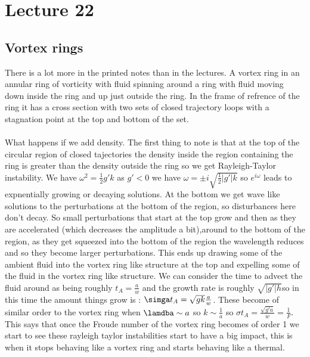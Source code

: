 \documentclass{article}
\begin{document}
                         \section{Lecture 22}
                         \subsection{Vortex rings}
                         There is a lot more in the printed notes than in the lectures. A vortex ring in an annular ring of vorticity with fluid spinning around a ring with fluid moving down inside the ring and up just outside the ring. In the frame of refrence of the ring it has a cross section with two sets of closed trajectory loops with a stagnation point at the top and bottom of the set.\\\\
                         What happens if we add density. The first thing to note is that at the top of the circular region of closed tajectories the density inside the region containing the ring is greater than the density outside the ring so we get Rayleigh-Taylor instability. We have $\omega^2 = \frac{1}{2} g' k$ as $g' <0$ we have $\omega = \pm i \sqrt{ \frac{1}{2} |g'| k}$ so $e^{i \omega}$ leads to expnentially growing or decaying solutions. At the bottom we get wave like solutions to the perturbations at the bottom of the region, so disturbances here don't decay. So small perturbations that start at the top grow and then as they are accelerated (which decreases the amplitude a bit),around to the bottom of the region, as they get squeezed into the bottom of the region the wavelength reduces and so they become larger perturbations. This ends up drawing some of the ambient fluid into the vortex ring like structure at the top and expelling some of the fluid in the vortex ring like structure. We can consider the time to advect the fluid around as being roughly $t_A = \frac{a}{w}$ and the growth rate is roughly $\sqrt{ |g'|h}$so in this time the amount things grow is : $\simga t_A = \sqrt{ g k} \frac{a}{w}$. These become of similar order to the vortex ring when $\lamdba \sim a$ so $k \sim \frac{1}{a}$ so $\sigma t_A = \frac{\sqrt{g' a}}{w} = \frac{1}{F}$. This says that once the Froude number of the vortex ring becomes of order 1 we start to see these rayleigh taylor instabilities start to have a big impact, this is when it stops behaving like a vortex ring and starts behaving like a thermal.
\end{document}
